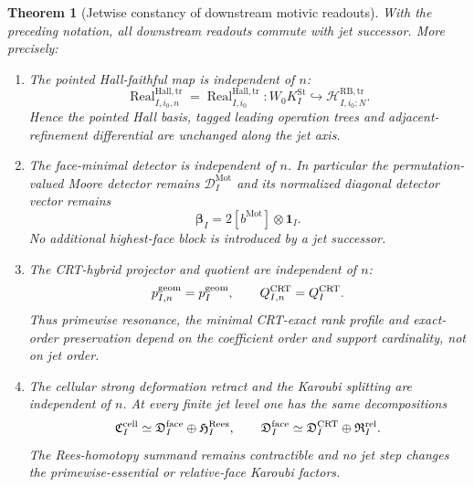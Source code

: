 \documentclass[11pt]{article}
\newtheorem{theorem}{Theorem}[section]
\theoremstyle{remark}
\newcommand{\Mot}{\mathrm{Mot}}
\newcommand{\Real}{\operatorname{Real}}
\begin{document}
\begin{theorem}[Jetwise constancy of downstream motivic readouts]
\label{P2M-thm:v37-readout-jet-constancy}
With the preceding notation, all downstream readouts commute with jet
successor.  More precisely:
\begin{enumerate}[label=\textup{(\roman*)}]
\item The pointed Hall-faithful map is independent of $n$:
\begin{equation}\label{P2M-eq:v37-hall-jet-constant}
 \Real_{I,i_0,n}^{\mathrm{Hall,tr}}
 =\Real_{I,i_0}^{\mathrm{Hall,tr}}:
 W_0K_I^{\mathrm{St}}
 \hookrightarrow
 \mathscr H_{I,i_0;N}^{\mathrm{RB,tr}}.
\end{equation}
Hence the pointed Hall basis, tagged leading operation trees and
adjacent-refinement differential are unchanged along the jet axis.

\item The face-minimal detector is independent of $n$.  In particular the
permutation-valued Moore detector remains $\mathcal D_I^{\Mot}$ and its
normalized diagonal detector vector remains
\begin{equation}\label{P2M-eq:v37-face-vector-jet-constant}
 \boldsymbol\beta_I=2[b^{\Mot}]\otimes\mathbf1_I.
\end{equation}
No additional highest-face block is introduced by a jet successor.

\item The CRT-hybrid projector and quotient are independent of $n$:
\begin{equation}\label{P2M-eq:v37-crt-projector-jet-constant}
 p_{I,n}^{\rm geom}=p_I^{\rm geom},
 \qquad
 Q_{I,n}^{\rm CRT}=Q_I^{\rm CRT}.
\end{equation}
Thus primewise resonance, the minimal CRT-exact rank profile and exact-order
preservation depend on the coefficient order and support cardinality, not on
jet order.

\item The cellular strong deformation retract and the Karoubi splitting are
independent of $n$.  At every finite jet level one has the same decompositions
\begin{equation}\label{P2M-eq:v37-karoubi-jet-constant}
 \mathfrak C_I^{\rm cell}
 \simeq
 \mathfrak D_I^{\rm face}\oplus\mathfrak H_I^{\rm Rees},
 \qquad
 \mathfrak D_I^{\rm face}
 \simeq
 \mathfrak D_I^{\rm CRT}\oplus\mathfrak R_I^{\rm rel}.
\end{equation}
The Rees-homotopy summand remains contractible and no jet step changes the
primewise-essential or relative-face Karoubi factors.


\end{enumerate}
\end{theorem}
\end{document}
